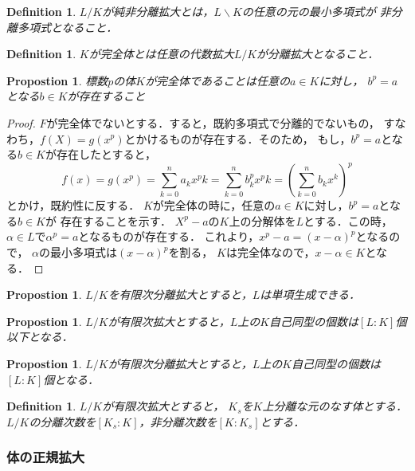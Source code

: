 \documentclass{ujarticle}
\newtheorem{dfn}[thm]{Definition}
\newtheorem{prop}[thm]{Propostion}
\begin{document}
\begin{dfn}
 $L/K$が純非分離拡大とは，$L\backslash K$の任意の元の最小多項式が
 非分離多項式となること．
\end{dfn}

\begin{dfn}
 $K$が完全体とは任意の代数拡大$L/K$が分離拡大となること．
\end{dfn}

\begin{prop}
 標数$p$の体$K$が完全体であることは任意の$a \in K$に対し，
 $b^p=a$となる$b \in K$が存在すること
\end{prop}
\begin{proof}
  $F$が完全体でないとする．すると，既約多項式で分離的でないもの，
  すなわち，$f(X)=g(x^p)$とかけるものが存在する．そのため，
  もし，$b^p=a$となる$b \in K$が存在したとすると，
  \begin{equation*}
   f(x)=g(x^p)=\sum_{k=0}^na_kx^pk=
  　\sum_{k=0}^nb_k^px^pk=(\sum_{k=0}^nb_kx^k)^p
  \end{equation*}
  とかけ，既約性に反する．
  $K$が完全体の時に，任意の$a \in K$に対し，$b^p=a$となる$b \in K$が
  存在することを示す．
  $X^p-a$の$K$上の分解体を$L$とする．この時，
  $\alpha \in L$で$\alpha^p=a$となるものが存在する．
  これより，$x^p-a=(x-\alpha)^p$となるので，
  $\alpha$の最小多項式は$(x-\alpha)^p$を割る，
  $K$は完全体なので，$x - \alpha \in K$となる．
\end{proof}

\begin{prop}
 $L/K$を有限次分離拡大とすると，$L$は単項生成できる．
\end{prop}


\begin{prop}
 $L/K$が有限次拡大とすると，$L$上の$K$自己同型の個数は$[L:K]$個以下となる．
\end{prop}

\begin{prop}
   $L/K$が有限次分離拡大とすると，$L$上の$K$自己同型の個数は$[L:K]$個となる．
\end{prop}

\begin{dfn}
  $L/K$が有限次拡大とすると，
  $K_s$を$K$上分離な元のなす体とする．$L/K$の分離次数を$[K_s:K]$，非分離次数を$[K:K_s]$とする．
\end{dfn}

\subsubsection{体の正規拡大}
\label{sub:体の正規拡大}
\end{document}
